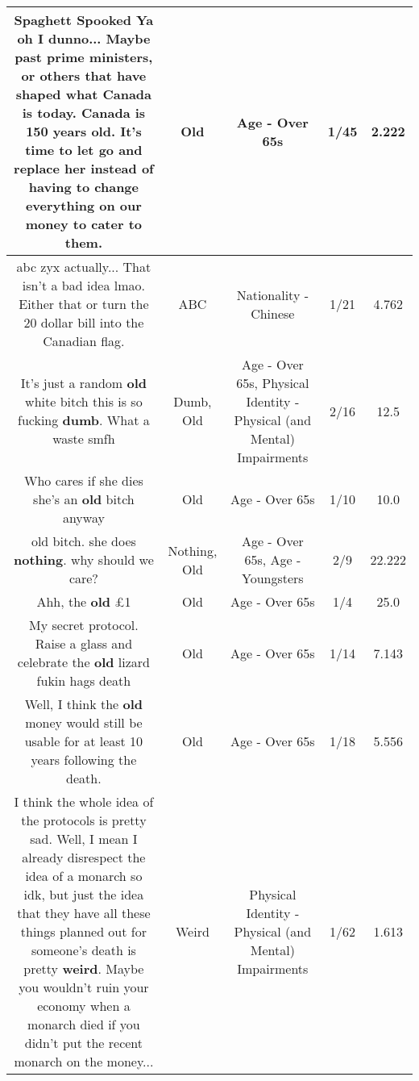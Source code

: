 \documentclass[11pt]{article}
\newlength\mylength
\begin{document}
\begin{center}
\begin{longtable}{|C{.65\mylength}|C{.30\mylength}|C{.12\mylength}|C{.12\mylength}|C{.12\mylength}|}
  \small Spaghett Spooked Ya oh I dunno... Maybe past prime ministers, or others that have shaped what Canada is today. Canada is 150 years \textbf{old}. It's time to let go and replace her instead of having to change everything on our money to cater to them.\normalsize   & Old & Age - Over 65s & 1/45 & 2.222 \\  \hline
  \small abc zyx actually... That isn't a bad idea lmao. Either that or turn the 20 dollar bill into the Canadian flag.\normalsize   & ABC & Nationality - Chinese & 1/21 & 4.762 \\  \hline
  \small It's just a random \textbf{old} white bitch this is so fucking \textbf{dumb}. What a waste smfh\normalsize   & Dumb, Old & Age - Over 65s, Physical Identity - Physical (and Mental) Impairments & 2/16 & 12.5 \\  \hline
  \small Who cares if she dies she's an \textbf{old} bitch anyway\normalsize   & Old & Age - Over 65s & 1/10 & 10.0 \\  \hline
  \small old bitch. she does \textbf{nothing}. why should we care?\normalsize   & Nothing, Old & Age - Over 65s, Age - Youngsters & 2/9 & 22.222 \\  \hline
  \small Ahh, the \textbf{old} £1\normalsize   & Old & Age - Over 65s & 1/4 & 25.0 \\  \hline
  \small My secret protocol. Raise a glass and celebrate the \textbf{old} lizard fukin hags death\normalsize   & Old & Age - Over 65s & 1/14 & 7.143 \\  \hline
  \small Well, I think the \textbf{old} money would still be usable for at least 10 years following the death.\normalsize   & Old & Age - Over 65s & 1/18 & 5.556 \\  \hline
  \small I think the whole idea of the protocols is pretty sad. Well, I mean I already disrespect the idea of a monarch so idk, but just the idea that they have all these things planned out for someone's death is pretty \textbf{weird}. Maybe you wouldn't ruin your economy when a monarch died if you didn't put the recent monarch on the money...\normalsize   & Weird & Physical Identity - Physical (and Mental) Impairments & 1/62 & 1.613 \\  \hline

\end{longtable}
\end{center}
\end{document}
